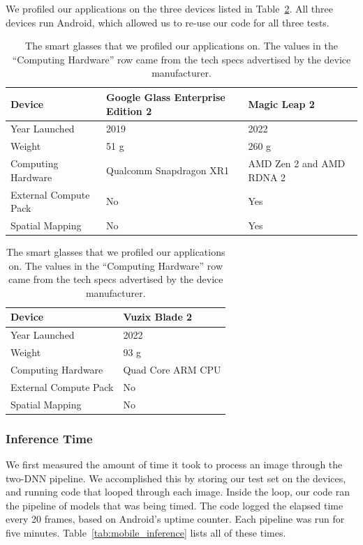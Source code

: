 We profiled our applications on the three devices listed in
Table~\ref{tab:devices}.
All three devices run Android, which allowed us to re-use our code for all three
tests.

\begin{table}
\begin{tabular}{|l||l|l|}
  \hline
  Device & Google Glass Enterprise Edition 2 & Magic Leap 2 \\
  \hline
  \hline
  Year Launched & 2019 & 2022 \\
  Weight & 51 g & 260 g \\
  Computing Hardware & Qualcomm Snapdragon XR1 & AMD Zen 2 and AMD RDNA 2 \\
  External Compute Pack & No & Yes \\
  Spatial Mapping & No & Yes \\
  \hline
\end{tabular}
\begin{tabular}{|l||l|}
  \hline
  Device & Vuzix Blade 2\\
  \hline
  \hline
  Year Launched & 2022\\
  Weight & 93 g \\
  Computing Hardware & Quad Core ARM CPU\\
  External Compute Pack & No\\
  Spatial Mapping & No\\
  \hline
\end{tabular}
  \caption{
    The smart glasses that we profiled our applications on. The values in the
    ``Computing Hardware'' row came from the tech specs advertised by the device
    manufacturer.
  }\label{tab:devices}
\end{table}

\subsubsection{Inference Time}

We first measured the amount of time it took to process an image through the
two-DNN pipeline.
We accomplished this by storing our test set on the devices, and running code
that looped through each image.
Inside the loop, our code ran the pipeline of models that was being timed.
The code logged the elapsed time every 20 frames, based on Android's uptime
counter.
Each pipeline was run for five minutes.
Table~\ref{tab:mobile_inference} lists all of these times.

